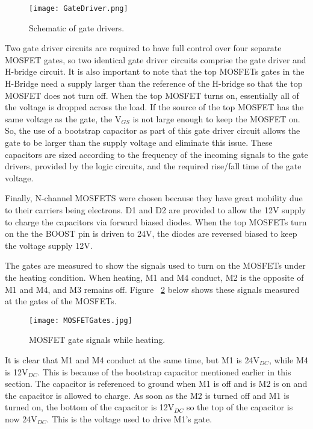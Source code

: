 \documentclass[11pt,letter]{article}
\begin{document}
\begin{figure}[H]
    \centering
    \texttt{[image: GateDriver.png]}
    \caption{Schematic of gate drivers.}
    \label{fig:gatedrivers}
\end{figure}

Two gate driver circuits are required to have full control over four separate MOSFET gates, so two identical gate driver circuits comprise the gate driver and H-bridge circuit. It is also important to note that the top MOSFETs gates in the H-Bridge need a supply larger than the reference of the H-bridge so that the top MOSFET does not turn off. When the top MOSFET turns on, essentially all of the voltage is dropped across the load. If the source of the top MOSFET has the same voltage as the gate, the V$_{GS}$ is not large enough to keep the MOSFET on. So, the use of a bootstrap capacitor as part of this gate driver circuit allows the gate to be larger than the supply voltage and eliminate this issue. These capacitors are sized according to the frequency of the incoming signals to the gate drivers, provided by the logic circuits, and the required rise/fall time of the gate voltage.

Finally, N-channel MOSFETS were chosen because they have great mobility due to their carriers being electrons. D1 and D2 are provided to allow the 12V supply to charge the capacitors via forward biased diodes. When the top MOSFETs turn on the the BOOST pin is driven to 24V, the diodes are reversed biased to keep the voltage supply 12V.

The gates are measured to show the signals used to turn on the MOSFETs under the heating condition. When heating, M1 and M4 conduct, M2 is the opposite of M1 and M4, and M3 remains off. Figure ~\ref{fig:mosfetgates} below shows these signals measured at the gates of the MOSFETs.

\begin{figure}[H]
    \centering
    \texttt{[image: MOSFETGates.jpg]}
    \caption{MOSFET gate signals while heating.}
    \label{fig:mosfetgates}
\end{figure}

It is clear that M1 and M4 conduct at the same time, but M1 is 24V$_{DC}$, while M4 is 12V$_{DC}$. This is because of the bootstrap capacitor mentioned earlier in this section. The capacitor is referenced to ground when M1 is off and is M2 is on and the capacitor is allowed to charge. As soon as the M2 is turned off and M1 is turned on, the bottom of the capacitor is 12V$_{DC}$ so the top of the capacitor is now 24V$_{DC}$. This is the voltage used to drive M1's gate.
\end{document}

